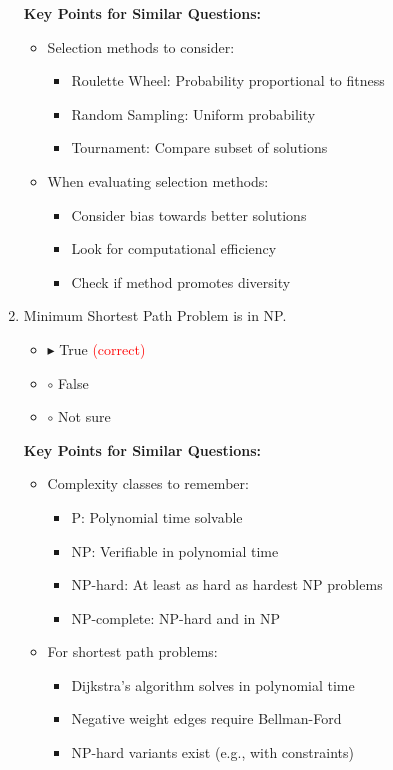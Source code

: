 \begin{enumerate}[label=\alph*)]
\textbf{Key Points for Similar Questions:}
\begin{itemize}
\item Selection methods to consider:
  \begin{itemize}
  \item Roulette Wheel: Probability proportional to fitness
  \item Random Sampling: Uniform probability
  \item Tournament: Compare subset of solutions
  \end{itemize}
\item When evaluating selection methods:
  \begin{itemize}
  \item Consider bias towards better solutions
  \item Look for computational efficiency
  \item Check if method promotes diversity
  \end{itemize}
\end{itemize}

\item Minimum Shortest Path Problem is in NP.
\begin{itemize}
\item $\blacktriangleright$ True \hspace{1em} \textcolor{red}{(correct)}
\item $\circ$ False
\item $\circ$ Not sure
\end{itemize}

\textbf{Key Points for Similar Questions:}
\begin{itemize}
\item Complexity classes to remember:
  \begin{itemize}
  \item P: Polynomial time solvable
  \item NP: Verifiable in polynomial time
  \item NP-hard: At least as hard as hardest NP problems
  \item NP-complete: NP-hard and in NP
  \end{itemize}
\item For shortest path problems:
  \begin{itemize}
  \item Dijkstra's algorithm solves in polynomial time
  \item Negative weight edges require Bellman-Ford
  \item NP-hard variants exist (e.g., with constraints)
  \end{itemize}
\end{itemize}


\end{enumerate}
